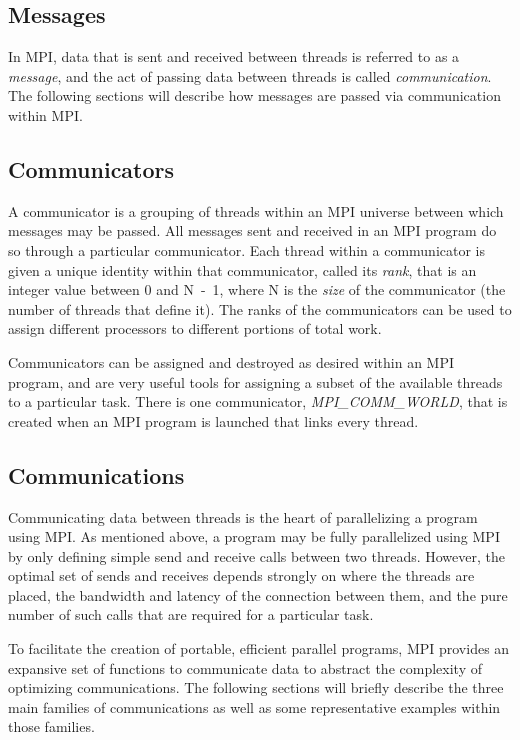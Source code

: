 \subsection{Messages}

In MPI, data that is sent and received between threads is referred to as a
\emph{message}, and the act of passing data between threads is called
\emph{communication}. The following sections will describe how messages are
passed via communication within MPI.

\subsection{Communicators}

A communicator is a grouping of threads within an MPI universe between which
messages may be passed. All messages sent and received in an MPI program do so
through a particular communicator. Each thread within a communicator is given a
unique identity within that communicator, called its \emph{rank}, that is an
integer value between 0 and \mbox{N - 1}, where N is the \emph{size} of the
communicator (\ie the number of threads that define it). The ranks of the
communicators can be used to assign different processors to different portions
of total work.

Communicators can be assigned and destroyed as desired within an MPI program,
and are very useful tools for assigning a subset of the available threads to a
particular task. There is one communicator, \emph{MPI\_COMM\_WORLD}, that is
created when an MPI program is launched that links every thread.

\subsection{Communications}

Communicating data between threads is the heart of parallelizing a program using
MPI. As mentioned above, a program may be fully parallelized using MPI by only
defining simple send and receive calls between two threads. However, the optimal
set of sends and receives depends strongly on where the threads are placed, the
bandwidth and latency of the connection between them, and the pure number of
such calls that are required for a particular task.

To facilitate the creation of portable, efficient parallel programs, MPI
provides an expansive set of functions to communicate data to abstract the
complexity of optimizing communications. The following sections will briefly
describe the three main families of communications as well as some
representative examples within those families.

